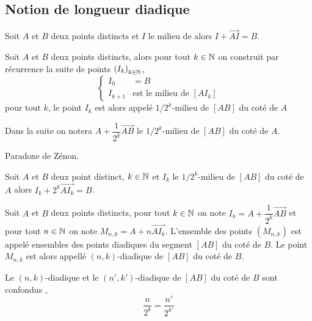         \subsection{Notion de longueur diadique}

\begin{prop}
   Soit $A$ et $B$ deux points distincts et $I$ le milieu de alors $I+\overrightarrow{AI}=B$.
\end{prop}
\begin{defi}[$1/2^k$-milieu]
    Soit $A$ et $B$ deux points distincts, alors pour tout $k\in \mathbb{N}$ on construit par récurrence la suite de points $\left(I_{k}\right)_{k \in \mathbb{N}}$,
    \begin{equation*}
        \left\{\begin{array}{rl}
             I_0 & = B\\
             I_{k+1} & \text{est le  milieu de $[AI_k]$}  
        \end{array}
        \right.
    \end{equation*}
    pour tout $k$, le point $I_k$ est alors appelé $1/2^k$-milieu de $[AB]$ du coté de $A$
\end{defi}
\begin{rema}
    Dans la suite on notera $A + \dfrac{1}{2^k}\overrightarrow{AB}$ le $1/2^k$-milieu de $[AB]$ du coté de $A$.
\end{rema}
\begin{rema}
    Paradoxe de Zénon.
\end{rema}
\begin{prop}
    Soit $A$ et $B$ deux point distinct, $k\in\mathbb{N}$ et $I_k$ le $1/2^k$-milieu de $[AB]$ du coté de $A$ alors $I_k+2^k \overrightarrow{AI_k}=B$.
\end{prop}
\begin{defi}
    Soit $A$ et $B$ deux points distincts, pour tout $k\in \mathbb{N}$ on note $I_k=A + \dfrac{1}{2^k}\overrightarrow{AB}$ et pour tout $n\in \mathbb{N}$ on note $M_{n,k} = A + n \overrightarrow{AI_k}$. L'ensemble des points $\left(M_{n,k}\right)$ est appelé ensembles des points diadiques du segment $[AB]$ du coté de $B$. Le point $M_{n,k}$ est alors appellé $(n,k)$-diadique de $[AB]$ du coté de $B$.
\end{defi}
\begin{prop}\label{prop-diadiqueconfondu}
    Le $(n,k)$-diadique et le $(n',k')$-diadique de $[AB]$ du coté de $B$ sont confondus \ssi,
    \begin{equation*}
        \dfrac{n}{2^k}=\dfrac{n'}{2^{k'}}
    \end{equation*}
\end{prop}
